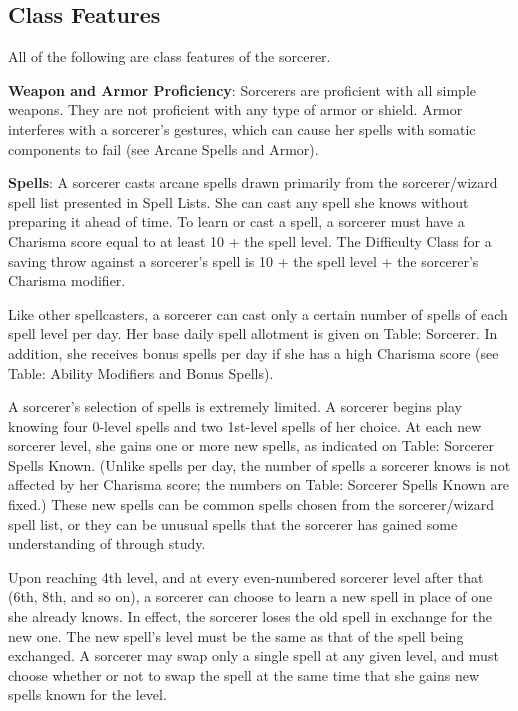 \subsection{Class Features}

				
All of the following are class features of the sorcerer.
				
\textbf{Weapon and Armor Proficiency}: Sorcerers are proficient with all simple weapons. They are not proficient with any type of armor or shield. Armor interferes with a sorcerer's gestures, which can cause her spells with somatic components to fail (see Arcane Spells and Armor).
				
\textbf{Spells}: A sorcerer casts arcane spells drawn primarily from the sorcerer/wizard spell list presented in Spell Lists. She can cast any spell she knows without preparing it ahead of time. To learn or cast a spell, a sorcerer must have a Charisma score equal to at least 10 + the spell level. The Difficulty Class for a saving throw against a sorcerer's spell is 10 + the spell level + the sorcerer's Charisma modifier.
				
Like other spellcasters, a sorcerer can cast only a certain number of spells of each spell level per day. Her base daily spell allotment is given on Table: Sorcerer. In addition, she receives bonus spells per day if she has a high Charisma score (see Table: Ability Modifiers and Bonus Spells).
				
A sorcerer's selection of spells is extremely limited. A sorcerer begins play knowing four 0-level spells and two 1st-level spells of her choice. At each new sorcerer level, she gains one or more new spells, as indicated on Table: Sorcerer Spells Known. (Unlike spells per day, the number of spells a sorcerer knows is not affected by her Charisma score; the numbers on Table: Sorcerer Spells Known are fixed.) These new spells can be common spells chosen from the sorcerer/wizard spell list, or they can be unusual spells that the sorcerer has gained some understanding of through study. 
				
Upon reaching 4th level, and at every even-numbered sorcerer level after that (6th, 8th, and so on), a sorcerer can choose to learn a new spell in place of one she already knows. In effect, the sorcerer loses the old spell in exchange for the new one. The new spell's level must be the same as that of the spell being exchanged. A sorcerer may swap only a single spell at any given level, and must choose whether or not to swap the spell at the same time that she gains new spells known for the level.
				
